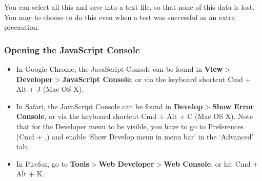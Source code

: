 \documentclass[11pt, oneside]{article}   	%
\begin{document}
		You can select all this and save into a text file, so that none of this data is lost. You may to choose to do this even when a test was successful as an extra precaution. 

		\subsubsection{Opening the JavaScript Console}
                        \begin{itemize}
                        \item In Google Chrome, the JavaScript Console can be found in \textbf{View$>$Developer$>$JavaScript Console}, or via the keyboard shortcut Cmd + Alt + J (Mac OS X). 
                        \item In Safari, the JavaScript Console can be found in \textbf{Develop$>$Show Error Console}, or via the keyboard shortcut Cmd + Alt + C (Mac OS X). Note that for the Developer menu to be visible, you have to go to Preferences (Cmd + ,) and enable `Show Develop menu in menu bar' in the `Advanced' tab. 
                        \item In Firefox, go to \textbf{Tools$>$Web Developer$>$Web Console}, or hit Cmd + Alt + K. 
                        \end{itemize}

\end{document}
